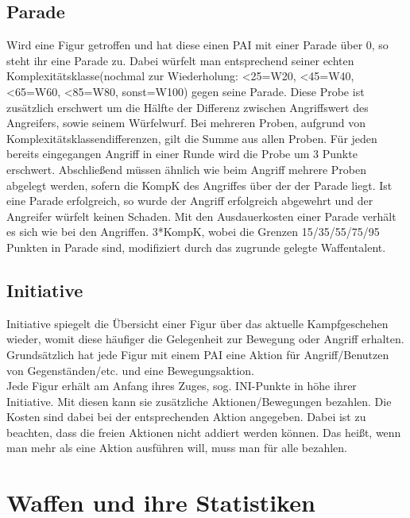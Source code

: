 \documentclass[a4paper,12pt,oneside]{book}
\begin{document}
\section{Parade}
Wird eine Figur getroffen und hat diese einen PAI mit einer Parade über 0, so steht ihr eine Parade zu. Dabei würfelt man entsprechend seiner echten Komplexitätsklasse(nochmal zur Wiederholung: \textless25=W20, \textless45=W40, \textless65=W60, \textless85=W80, sonst=W100) gegen seine Parade. Diese Probe ist zusätzlich erschwert um die Hälfte der Differenz zwischen Angriffswert des Angreifers, sowie seinem Würfelwurf. 
Bei mehreren Proben, aufgrund von Komplexitätsklassendifferenzen, gilt die Summe aus allen Proben. Für jeden bereits eingegangen Angriff in einer Runde wird die Probe um 3 Punkte erschwert. Abschließend müssen ähnlich wie beim Angriff mehrere Proben abgelegt werden, sofern die KompK des Angriffes über der der Parade liegt.
Ist eine Parade erfolgreich, so wurde der Angriff erfolgreich abgewehrt und der Angreifer würfelt keinen Schaden.
Mit den Ausdauerkosten einer Parade verhält es sich wie bei den Angriffen. 3*KompK, wobei die Grenzen 15/35/55/75/95 Punkten in Parade sind, modifiziert durch das zugrunde gelegte Waffentalent.

\section{Initiative}
Initiative spiegelt die Übersicht einer Figur über das aktuelle Kampfgeschehen wieder, womit diese häufiger die Gelegenheit zur Bewegung oder Angriff erhalten. Grundsätzlich hat jede Figur mit einem PAI eine Aktion für Angriff/Benutzen von Gegenständen/etc. und eine Bewegungsaktion.
\\Jede Figur erhält am Anfang ihres Zuges, sog. INI-Punkte in höhe ihrer Initiative. Mit diesen kann sie zusätzliche Aktionen/Bewegungen bezahlen. Die Kosten sind dabei bei der entsprechenden Aktion angegeben. Dabei ist zu beachten, dass die freien Aktionen nicht addiert werden können. Das heißt, wenn man mehr als eine Aktion ausführen will, muss man für alle bezahlen.

\chapter{Waffen und ihre Statistiken}
\end{document}
